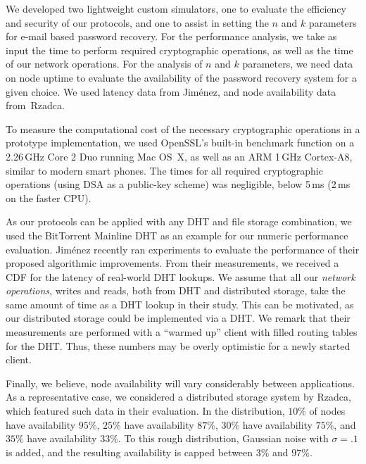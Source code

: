 
We developed two lightweight custom simulators, one to evaluate the
efficiency and security of our protocols, and one to assist in setting
the $n$ and $k$ parameters for e-mail based password recovery. For the
performance analysis, we take as input the time to perform required
cryptographic operations, as well as the time of our network
operations. For the analysis of $n$ and $k$ parameters, we need
data on node uptime to evaluate the availability of the password
recovery system for a given choice. We used latency data 
from Jiménez\etal\cite{JimenezOK11}, and node availability data
from~Rzadca\etal\cite{RzadcaDB10}.

To measure the computational cost of the necessary cryptographic
operations in a prototype implementation, we used OpenSSL's built-in
benchmark function on a 2.26\,GHz Core 2 Duo running Mac OS~X, as well as an ARM
1\,GHz Cortex-A8, similar to modern smart phones. The times for all required
cryptographic operations (using DSA as a public-key scheme) was negligible,
below 5\,ms (2\,ms on the faster CPU).

As our protocols can be applied with any DHT and file storage combination, we
used the BitTorrent Mainline DHT as an example for our numeric performance
evaluation. Jiménez\etal\cite{JimenezOK11} recently ran 
experiments to evaluate the performance of their proposed algorithmic
improvements. From their measurements, we received a CDF for the latency of
real-world DHT lookups. We assume that all our \emph{network operations}, writes and
reads, both from DHT and distributed storage, take the same amount of
time as a DHT lookup in their study.
This can be
motivated, as our distributed storage could be implemented via a DHT.
We remark that their measurements are performed with a ``warmed
up'' client with filled routing tables for the DHT. Thus, these numbers may be
overly optimistic for a newly started client.

Finally, we believe, node availability will vary considerably between
applications. As a representative case, we considered a distributed
storage system by Rzadca\etal\cite{RzadcaDB10}, which featured such
data in their evaluation. In the distribution, $10\%$ of nodes have
availability $95\%$, $25\%$ have availability $87\%$, $30\%$ have
availability $75\%$, and $35\%$ have availability $33\%$. To this
rough distribution, Gaussian noise with $\sigma = .1$ is added, and
the resulting availability is capped between $3\%$ and $97\%$.

